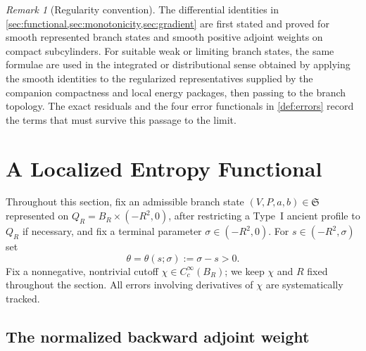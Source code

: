 \documentclass[11pt]{amsart}
\numberwithin{equation}{section}
\theoremstyle{plain}
\theoremstyle{definition}
\theoremstyle{remark}
\newtheorem{remark}[theorem]{Remark}
\newcommand{\State}{\mathfrak S}
\begin{document}
\begin{remark}[Regularity convention]
\label{rem:regularity-convention}
The differential identities in \cref{sec:functional,sec:monotonicity,sec:gradient}
are first stated and proved for smooth represented branch states and smooth
positive adjoint weights on compact subcylinders.  For suitable weak or
limiting branch states, the same formulae are used in the integrated or
distributional sense obtained by applying the smooth identities to the
regularized representatives supplied by the companion compactness and local
energy packages, then passing to the branch topology.  The exact residuals
and the four error functionals in \cref{def:errors} record the terms that
must survive this passage to the limit.
\end{remark}

\section{A Localized Entropy Functional}
\label{sec:functional}

Throughout this section, fix an admissible branch state
\((V,P,a,b)\in\State\) represented on \(Q_R=B_R\times(-R^2,0)\), after
restricting a Type~I ancient profile to \(Q_R\) if necessary, and fix a
terminal parameter \(\sigma\in(-R^2,0)\).  For \(s\in(-R^2,\sigma)\) set
\begin{equation}\label{eq:theta}
	\theta=\theta(s;\sigma):=\sigma-s>0.
\end{equation}
Fix a nonnegative, nontrivial cutoff \(\chi\in C_c^\infty(B_R)\); we keep
\(\chi\) and \(R\) fixed throughout the section.  All errors involving
derivatives of \(\chi\) are systematically tracked.

\subsection{The normalized backward adjoint weight}
\end{document}
